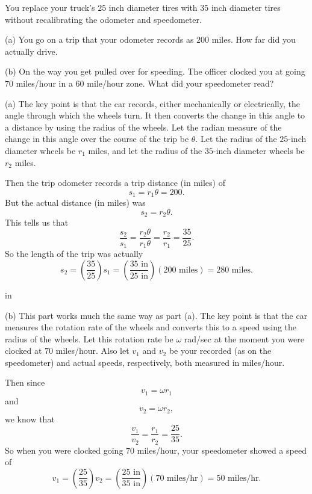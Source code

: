\documentclass{ximera}
\newcommand{\pskip}{\vskip 0.1 in}
\begin{document}
\begin{question}  \label{Q6521:Angles}
You replace  your truck's $25$ inch diameter tires with $35$ inch diameter tires without recalibrating the odometer and speedometer.

(a) You go on a trip that your odometer records as $200$ miles. How far did you actually drive.

(b) On the way you get pulled over for speeding. The officer clocked you at going $70$ miles/hour in a $60$ mile/hour zone. What did your speedometer read?

\begin{hint}
(a) The key point is that the car records, either mechanically or electrically, the angle through which the wheels turn. It then converts the change in this angle to a distance by using the radius of the wheels. Let the radian measure of the change in this angle over the course of the trip be $\theta$. Let the radius of the $25$-inch diameter wheels be $r_1$ miles, and let the radius of the $35$-inch diameter wheels be $r_2$ miles. 

Then the trip odometer records a trip distance (in miles) of 
\[
   s_1 = r_1\theta =200.
\]
But the actual distance (in miles) was
\[
  s_2 = r_2\theta .
\]
This tells us that
\[
    \frac{s_2}{s_1} = \frac{r_2\theta}{r_1 \theta} = \frac{r_2}{r_1} = \frac{35}{25}.
\]
So the length of the trip was actually
\[
   s_2 = \left( \frac{35}{25}\right) s_1 = \left(\frac{35\text{ in}}{25\text{ in}} \right) (200 \text{ miles}) = 280 \text{ miles}.
\]

\pskip

(b) This part works much the same way as part (a). The key point is that the car measures the rotation rate of the wheels and converts this to a speed using the radius of the wheels. Let this rotation rate be $\omega$ rad/sec at the moment you were clocked at $70$ miles/hour. Also let $v_1$ and $v_2$ be  your recorded (as on the speedometer) and actual speeds, respectively, both measured in miles/hour.

Then since
\[
  v_1 = \omega r_1
\]
and 
\[
  v_2 = \omega r_2 ,
\]
we know that
\[
    \frac{v_1}{v_2} =  \frac{r_1}{r_2} = \frac{25}{35}. 
\]
So when you were clocked going $70$ miles/hour, your speedometer showed a speed of
\[
   v_1 = \left( \frac{25}{35}\right) v_2 = \left(\frac{25\text{ in}}{35\text{ in}} \right) (70 \text{ miles/hr}) = 50 \text{ miles/hr}.
\]

\end{hint}

\end{question}
\end{document}
